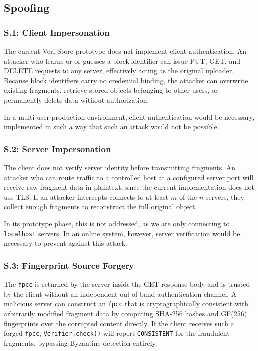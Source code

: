 \documentclass[../veristore_security_model.tex]{subfiles}
\begin{document}
\subsection{Spoofing}
\subsubsection{S.1: Client Impersonation}
The current Veri-Store prototype does not implement client authentication. An attacker who learns or or guesses a block identifier can issue PUT, GET, and DELETE requests to any server, effectively acting as the original uploader. Because block identifiers carry no credential binding, the attacker can overwrite existing fragments, retrieve stored objects belonging to other users, or permanently delete data without authorization.

In a multi-user production environment, client authentication would be necessary, implemented in such a way that such an attack would not be possible.

\subsubsection{S.2: Server Impersonation}
The client does not verify server identity before transmitting fragments. An attacker who can route traffic to a controlled host at a configured server port will receive raw fragment data in plaintext, since the current implementation does not use TLS. If an attacker intercepts connects to at least $m$ of the $n$ servers, they collect enough fragments to reconstruct the full original object.

In its prototype phase, this is not addressed, as we are only connecting to \texttt{localhost} servers. In an online system, however, server verification would be necessary to prevent against this attack.

\subsubsection{S.3: Fingerprint Source Forgery}
The \texttt{fpcc} is returned by the server inside the GET response body and is trusted by the client without an independent out-of-band authentication channel. A malicious server can construct an \texttt{fpcc} that is cryptographically consistent with arbitrarily modified fragment data by computing SHA-256 hashes and GF(256) fingerprints over the corrupted content directly. If the client receives such a forged \texttt{fpcc}, \texttt{Verifier.check()} will report \texttt{CONSISTENT} for the fraudulent fragments, bypassing Byzantine detection entirely.
\end{document}
